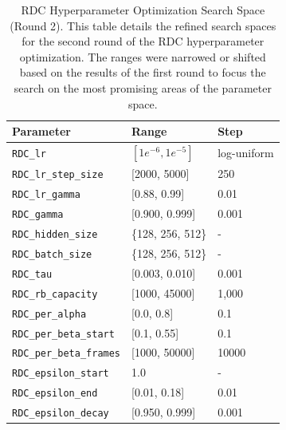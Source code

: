 \begin{table}[!htb]
    \centering
    \begin{tabular}{lll}
        \toprule
        \textbf{Parameter} & \textbf{Range} & \textbf{Step} \\
        \midrule
        \texttt{RDC\_lr}                 & $[1e^{-6}, 1e^{-5}]$      & log-uniform \\
        \texttt{RDC\_lr\_step\_size}     & [2000, 5000]               & 250 \\
        \texttt{RDC\_lr\_gamma}          & [0.88, 0.99]              & 0.01 \\
        \texttt{RDC\_gamma}              & [0.900, 0.999]              & 0.001\\
        \midrule
        \texttt{RDC\_hidden\_size}       & \{128, 256, 512\}     & - \\
        \texttt{RDC\_batch\_size}        & \{128, 256, 512\}     & - \\
        \texttt{RDC\_tau}                & [0.003, 0.010]            & 0.001 \\
        \midrule
        \texttt{RDC\_rb\_capacity}       & [1000, 45000]             & 1,000\\
        \texttt{RDC\_per\_alpha}         & [0.0, 0.8]                & 0.1\\
        \texttt{RDC\_per\_beta\_start}   & [0.1, 0.55]                & 0.1\\
        \texttt{RDC\_per\_beta\_frames}  & [1000, 50000]           & 10000\\
        \midrule
        \texttt{RDC\_epsilon\_start}     & 1.0                       & - \\
        \texttt{RDC\_epsilon\_end}       & [0.01, 0.18]              & 0.01 \\
        \texttt{RDC\_epsilon\_decay}     & [0.950, 0.999]            & 0.001\\
        \midrule
    \end{tabular}
    \caption{RDC Hyperparameter Optimization Search Space (Round 2). This table details the refined search spaces for the second round of the RDC hyperparameter optimization. The ranges were narrowed or shifted based on the results of the first round to focus the search on the most promising areas of the parameter space.}
    \label{tab:rdc_ho_second_round}
\end{table}
